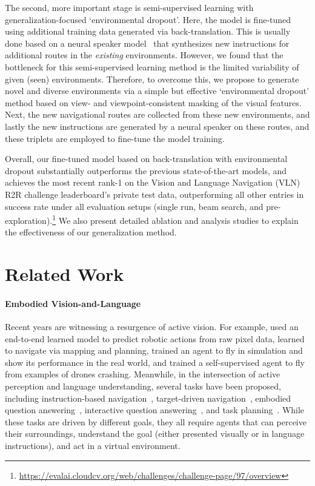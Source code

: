\documentclass[11pt,a4paper]{article}
\begin{document}
The second, more important stage is semi-supervised learning with generalization-focused `environmental dropout'. Here, the model is fine-tuned using additional training data generated via back-translation. This is usually done based on a neural speaker model~\cite{fried2018speaker} that synthesizes new instructions for additional routes in the \emph{existing} environments.
However, we found that the bottleneck for this semi-supervised learning method is the limited variability of given (seen) environments.
Therefore, to overcome this, we propose to generate novel and diverse environments via a simple but effective `environmental dropout' method based on view- and viewpoint-consistent masking of the visual features.
Next, the new navigational routes are collected from these new environments, and lastly the new instructions are generated by a neural speaker on these routes, and these triplets are employed to fine-tune the model training.


Overall, our fine-tuned model based on back-translation with environmental dropout substantially outperforms the previous state-of-the-art models, and achieves the most recent rank-1 on the Vision and Language Navigation (VLN) R2R challenge leaderboard's private test data, outperforming all other entries in success rate under all evaluation setups (single run, beam search, and pre-exploration).\footnote{\url{https://evalai.cloudcv.org/web/challenges/challenge-page/97/overview}} We also present detailed ablation and analysis studies to explain the effectiveness of our generalization method.

 \section{Related Work}


\paragraph{Embodied Vision-and-Language}
Recent years are witnessing a resurgence of active vision.
For example, \citet{Levine2016} used an end-to-end learned model to predict robotic actions from raw pixel data, \citet{gupta2017cognitive} learned to navigate via mapping and planning, \citet{sadeghi2017cadrl} trained an agent to fly in simulation and show its performance in the real world, and \citet{gandhi2017} trained a self-supervised agent to fly from examples of drones crashing.
Meanwhile, in the intersection of active perception and language understanding, several tasks have been proposed, including instruction-based navigation~\cite{chaplot2017gated,mattersim}, target-driven navigation~\cite{zhu2017target,gupta2017cognitive}, embodied question answering~\cite{das2018embodied}, interactive question answering~\cite{gordon2018iqa}, and task planning~\cite{zhu2017visual}.
While these tasks are driven by different goals, they all require agents that can perceive their surroundings, understand the goal (either presented visually or in language instructions), and act in a virtual environment.
\end{document}
